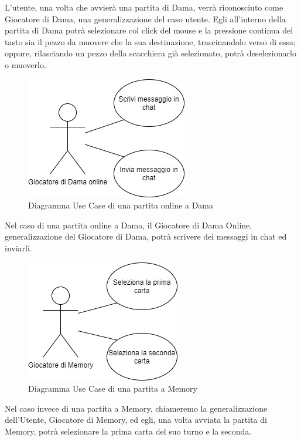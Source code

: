 \documentclass[12pt]{article}
\begin{document}
L'utente, una volta che avvierà una partita di Dama, verrà riconosciuto come Giocatore di Dama, una generalizzazione del caso utente. Egli all'interno della partita di Dama potrà selezionare col click del mouse e la pressione continua del tasto sia il pezzo da muovere che la sua destinazione, trascinandolo verso di essa; oppure, rilasciando un pezzo della scacchiera già selezionato, potrà deselezionarlo o muoverlo.

\begin{figure}[H]
\centering
\includegraphics[scale=.5]{UseCaseCheckersMultiplayer}
\caption{Diagramma Use Case di una partita online a Dama}
\label{img:usecasecheckersonline}
\end{figure}

Nel caso di una partita online a Dama, il Giocatore di Dama Online, generalizzazione del Giocatore di Dama, potrà scrivere dei messaggi in chat ed inviarli.

\begin{figure}[H]
\centering
\includegraphics[scale=.5]{UseCaseMemory}
\caption{Diagramma Use Case di una partita a Memory}
\label{img:usecasememory}
\end{figure}

Nel caso invece di una partita a Memory, chiameremo la generalizzazione dell'Utente, Giocatore di Memory, ed egli, una volta avviata la partita di Memory, potrà selezionare la prima carta del suo turno e la seconda.
\end{document}
